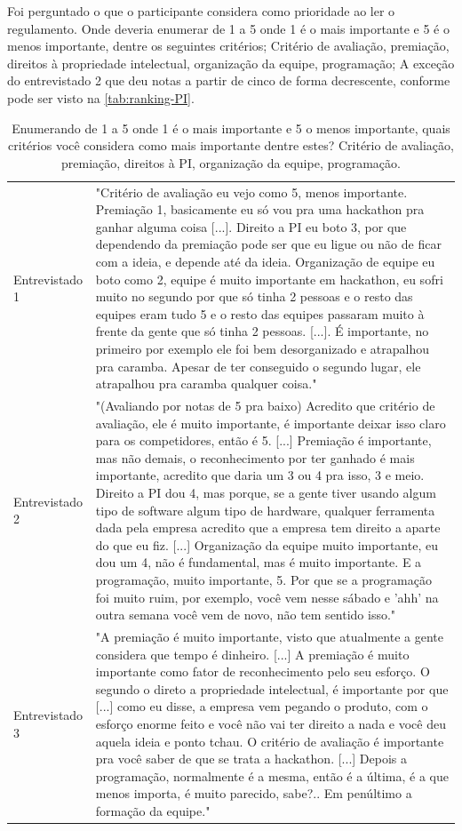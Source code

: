 Foi perguntado o que o participante considera como prioridade ao ler o regulamento. Onde deveria enumerar de 1 a 5 onde 1 é o mais importante e 5 é o menos importante, dentre os seguintes critérios; Critério de avaliação, premiação, direitos à propriedade intelectual, organização da equipe, programação; A exceção do entrevistado 2 que deu notas a partir de cinco de forma decrescente, conforme pode ser visto na \autoref{tab:ranking-PI}. 


\begin{table}[H]
\centering
\caption{Enumerando de 1 a 5 onde 1 é o mais importante e 5 o menos importante, quais critérios você considera como mais importante dentre estes? Critério de avaliação, premiação, direitos à PI, organização da equipe, programação.}
\label{tab:ranking-PI}
\begin{tabular}{l|p{}}
Entrevistado 1 &
  "Critério de avaliação eu vejo como 5, menos importante. Premiação 1, basicamente eu só vou pra uma hackathon pra ganhar alguma coisa {[}...{]}. Direito a PI eu boto 3, por que dependendo da premiação pode ser que eu ligue ou não de ficar com a ideia, e depende até da ideia. Organização de equipe eu boto como 2, equipe é muito importante em hackathon, eu sofri muito no segundo por que só tinha 2 pessoas e o resto das equipes eram tudo 5 e o resto das equipes passaram muito à frente da gente que só tinha 2 pessoas. {[}...{]}. É importante, no primeiro por exemplo ele foi bem desorganizado e atrapalhou pra caramba. Apesar de ter conseguido o segundo lugar, ele atrapalhou pra caramba qualquer coisa." \\
Entrevistado 2 &
  "(Avaliando por notas de 5 pra baixo) Acredito que critério de avaliação, ele é muito importante, é importante deixar isso claro para os competidores, então é 5. {[}...{]} Premiação é importante, mas não demais, o reconhecimento por ter ganhado é mais importante, acredito que daria um 3 ou 4 pra isso, 3 e meio. Direito a PI dou 4, mas porque, se a gente tiver usando algum tipo de software algum tipo de hardware, qualquer ferramenta dada pela empresa acredito que a empresa tem direito a aparte do que eu fiz. {[}...{]} Organização da equipe muito importante, eu dou um 4, não é fundamental, mas é muito importante. E a programação, muito importante, 5. Por que se a programação foi muito ruim, por exemplo, você vem nesse sábado e 'ahh' na outra semana você vem de novo, não tem sentido isso." \\
Entrevistado 3 &
  "A premiação é muito importante, visto que atualmente a gente considera que tempo é dinheiro. {[}...{]} A premiação é muito importante como fator de reconhecimento pelo seu esforço. O segundo o direto a propriedade intelectual, é importante por que {[}...{]} como eu disse, a empresa vem pegando o produto, com o esforço enorme feito e você não vai ter direito a nada e você deu aquela ideia e ponto tchau. O critério de avaliação é importante pra você saber de que se trata a hackathon. {[}...{]} Depois a programação, normalmente é a mesma, então é a última, é a que menos importa, é muito parecido, sabe?.. Em penúltimo a formação da equipe." \\

\end{tabular}
\end{table}
